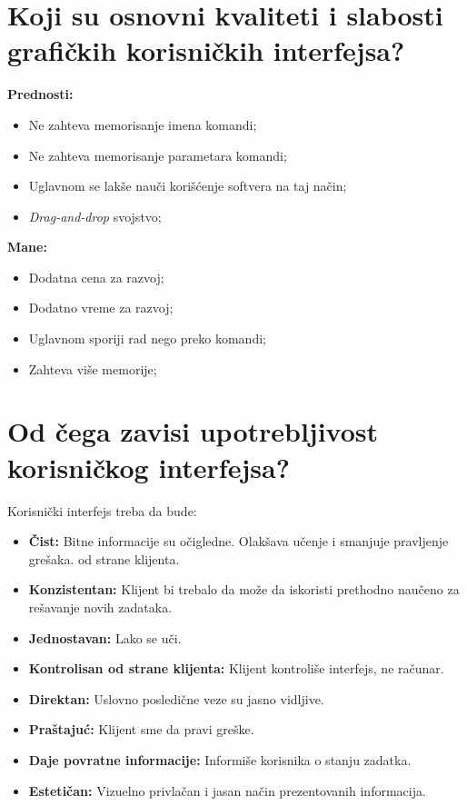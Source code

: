 \documentclass[a4paper]{article}
\begin{document}
\section{Koji su osnovni kvaliteti i slabosti grafičkih korisničkih interfejsa?}
  \noindent \textbf{Prednosti:}
  \begin{itemize}
    \item Ne zahteva memorisanje imena komandi;
    \item Ne zahteva memorisanje parametara komandi;
    \item Uglavnom se lakše nauči korišćenje softvera na taj način;
    \item \textit{Drag-and-drop} svojstvo;
  \end{itemize}
  \textbf{Mane:}
  \begin{itemize}
    \item Dodatna cena za razvoj;
    \item Dodatno vreme za razvoj; 
    \item Uglavnom sporiji rad nego preko komandi;
    \item Zahteva više memorije;
  \end{itemize}

\section{Od čega zavisi upotrebljivost korisničkog interfejsa?}
  Korisnički interfejs treba da bude:
  \begin{itemize}
    \item \textbf{Čist:} Bitne informacije su očigledne. Olakšava učenje i smanjuje pravljenje
          grešaka.
          od strane klijenta. 
    \item \textbf{Konzistentan:} Klijent bi trebalo da može da iskoristi prethodno naučeno
          za rešavanje novih zadataka.
    \item \textbf{Jednostavan:} Lako se uči.
    \item \textbf{Kontrolisan od strane klijenta:} Klijent kontroliše interfejs, ne računar.
    \item \textbf{Direktan:} Uslovno posledične veze su jasno vidljive.
    \item \textbf{Praštajuć:} Klijent sme da pravi greške.
    \item \textbf{Daje povratne informacije:} Informiše korisnika o stanju zadatka. 
    \item \textbf{Estetičan:} Vizuelno privlačan i jasan način prezentovanih informacija.\cite{uw_ui}
  \end{itemize}
\end{document}
